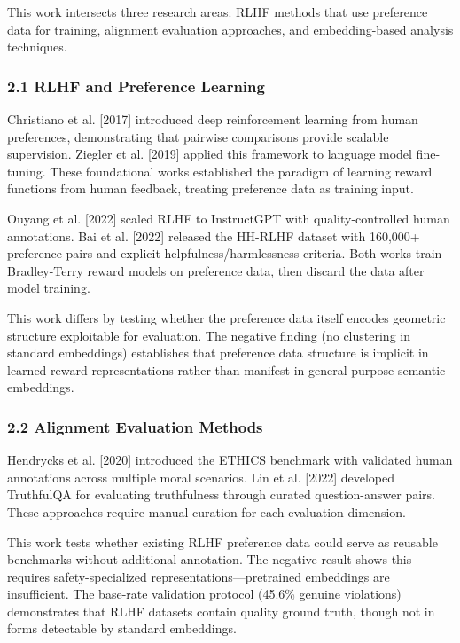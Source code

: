 
This work intersects three research areas: RLHF methods that use preference data for training, alignment evaluation approaches, and embedding-based analysis techniques.

\subsubsection{2.1 RLHF and Preference Learning}

Christiano et al. [2017] introduced deep reinforcement learning from human preferences, demonstrating that pairwise comparisons provide scalable supervision. Ziegler et al. [2019] applied this framework to language model fine-tuning. These foundational works established the paradigm of learning reward functions from human feedback, treating preference data as training input.

Ouyang et al. [2022] scaled RLHF to InstructGPT with quality-controlled human annotations. Bai et al. [2022] released the HH-RLHF dataset with 160,000+ preference pairs and explicit helpfulness/harmlessness criteria. Both works train Bradley-Terry reward models on preference data, then discard the data after model training.

This work differs by testing whether the preference data itself encodes geometric structure exploitable for evaluation. The negative finding (no clustering in standard embeddings) establishes that preference data structure is implicit in learned reward representations rather than manifest in general-purpose semantic embeddings.

\subsubsection{2.2 Alignment Evaluation Methods}

Hendrycks et al. [2020] introduced the ETHICS benchmark with validated human annotations across multiple moral scenarios. Lin et al. [2022] developed TruthfulQA for evaluating truthfulness through curated question-answer pairs. These approaches require manual curation for each evaluation dimension.

This work tests whether existing RLHF preference data could serve as reusable benchmarks without additional annotation. The negative result shows this requires safety-specialized representations—pretrained embeddings are insufficient. The base-rate validation protocol (45.6\% genuine violations) demonstrates that RLHF datasets contain quality ground truth, though not in forms detectable by standard embeddings.

